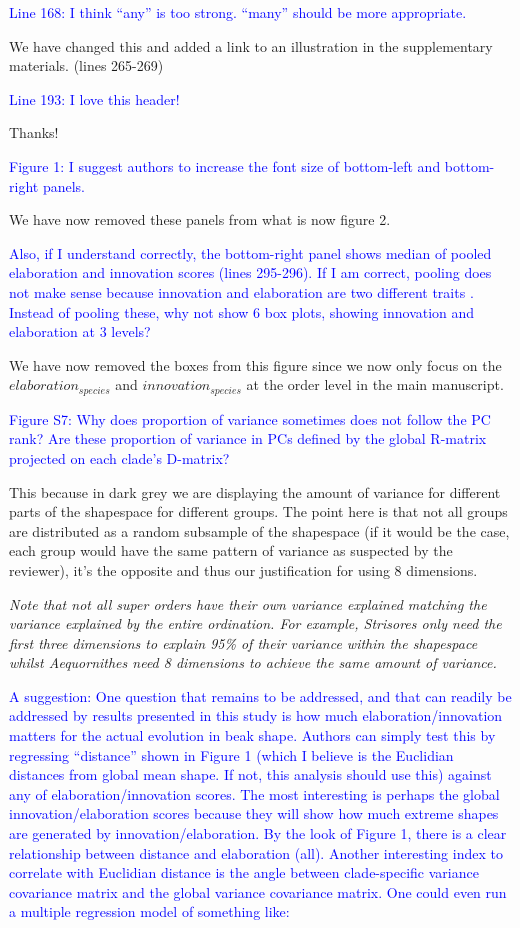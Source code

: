 \documentclass[12pt,letterpaper]{article}
\begin{document}
{\textcolor{blue}{Line 168: I think “any” is too strong. “many” should be more appropriate.}

We have changed this and added a link to an illustration in the supplementary materials. (lines 265-269)

\textcolor{blue}{Line 193: I love this header!}

Thanks!

\textcolor{blue}{Figure 1: I suggest authors to increase the font size of bottom-left and bottom-right panels.}

We have now removed these panels from what is now figure 2.

\textcolor{blue}{Also, if I understand correctly, the bottom-right panel shows median of pooled elaboration and innovation scores (lines 295-296). If I am correct, pooling does not make sense because innovation and elaboration are two different traits . Instead of pooling these, why not show 6 box plots, showing innovation and elaboration at 3 levels?}

We have now removed the boxes from this figure since we now only focus on the $elaboration_{species}$ and $innovation_{species}$ at the order level in the main manuscript.

\textcolor{blue}{Figure S7: Why does proportion of variance sometimes does not follow the PC rank? Are these proportion of variance in PCs defined by the global R-matrix projected on each clade’s D-matrix?}

This because in dark grey we are displaying the amount of variance for different parts of the shapespace for different groups. The point here is that not all groups are distributed as a random subsample of the shapespace (if it would be the case, each group would have the same pattern of variance as suspected by the reviewer), it’s the opposite and thus our justification for using 8 dimensions.

\noindent\textit{Note that not all super orders have their own variance explained matching the variance explained by the entire ordination. For example, Strisores only need the first three dimensions to explain 95\% of their variance within the shapespace whilst Aequornithes need 8 dimensions to achieve the same amount of variance.}

\textcolor{blue}{A suggestion: One question that remains to be addressed, and that can readily be addressed by results presented in this study is how much elaboration/innovation matters for the actual evolution in beak shape. Authors can simply test this by regressing “distance” shown in Figure 1 (which I believe is the Euclidian distances from global mean shape. If not, this analysis should use this) against any of elaboration/innovation scores. The most interesting is perhaps the global innovation/elaboration scores because they will show how much extreme shapes are generated by innovation/elaboration. By the look of Figure 1, there is a clear relationship between distance and elaboration (all). Another interesting index to correlate with Euclidian distance is the angle between clade-specific variance covariance matrix and the global variance covariance matrix. One could even run a multiple regression model of something like:}

}
\end{document}
